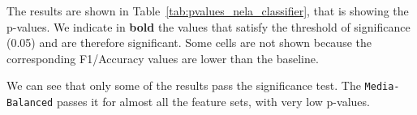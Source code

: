 \begin{table}[!htbp]
    \centering
    \caption{p-values of features set that have improvements in NELA dataset.}
    \label{tab:pvalues_nela_classifier}
\end{table}

The results are shown in Table~\ref{tab:pvalues_nela_classifier}, that is showing the p-values. We indicate in \textbf{bold} the values that satisfy the threshold of significance (0.05) and are therefore significant. Some cells are not shown because the corresponding F1/Accuracy values are lower than the baseline.

We can see that only some of the results pass the significance test. The \texttt{Media-Balanced} passes it for almost all the feature sets, with very low p-values.


